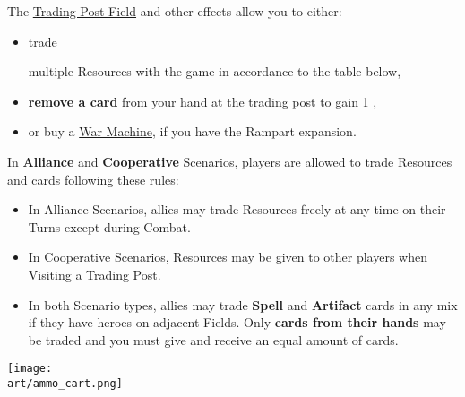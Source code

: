 \begin{multicols}{2}

The \hyperlink{Trading Post}{Trading Post Field} and other effects allow you to either:
\begin{itemize}
  \item \hypertarget{Trading}{trade} multiple Resources with the game in accordance to the table below,
  \item \textbf{remove a card} from your hand at the trading post to gain 1 ,
    \par
  \item or buy a \hyperlink{War Machines}{War Machine}, if you have the Rampart expansion.
\end{itemize}
In \textbf{Alliance} and \textbf{Cooperative} Scenarios, players are allowed to trade Resources and cards following these rules:
\begin{itemize}
  \item In Alliance Scenarios, allies may trade Resources freely at any time on their Turns except during Combat.
  \item In Cooperative Scenarios, Resources may be given to other players when Visiting a Trading Post.
  \columnbreak
  \item In both Scenario types, allies may trade \textbf{Spell} and \textbf{Artifact} cards in any mix if they have heroes on adjacent Fields.
    Only \textbf{cards from their hands} may be traded and you must give and receive an equal amount of cards.
\end{itemize}

\vspace*{\fill}
\texttt{[image: \\art/ammo\_cart.png]}

\end{multicols}

\vfill

